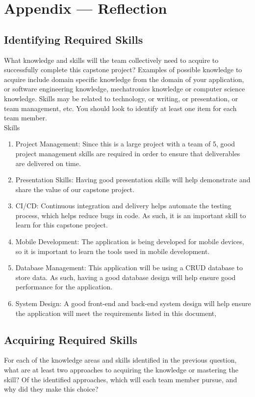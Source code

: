 \documentclass[12pt]{article}
\begin{document}
\newpage{}
\section*{Appendix --- Reflection}


\subsection*{Identifying Required Skills}
 What knowledge and skills will the team collectively need to acquire to successfully complete this capstone project?  Examples of possible knowledge to acquire include domain specific knowledge from the domain of your application, or software engineering knowledge, mechatronics knowledge or computer science knowledge.  Skills may be related to technology, or writing, or presentation, or team management, etc.  You should look to identify at least one item for each team member. \\

Skills
\begin{enumerate}
  \item Project Management: Since this is a large project with a team of 5, good project management skills are required in order to ensure that deliverables are delivered on time.
  \item Presentation Skills: Having good presentation skills will help demonstrate and share the value of our capstone project.
  \item CI/CD: Continuous integration and delivery helps automate the testing process, which helps reduce bugs in code. As such, it is an important skill to learn for this capstone project.  
  \item Mobile Development: The application is being developed for mobile devices, so it is important to learn the tools used in mobile development. 
  \item Database Management: This application will be using a CRUD database to store data. As such, having a good database design will help ensure good performance for the application.
  \item System Design: A good front-end and back-end system design will help ensure the application will meet the requirements listed in this document,
\end{enumerate}

\subsection*{Acquiring Required Skills}
For each of the knowledge areas and skills identified in the previous question, what are at least two approaches to acquiring the knowledge or  mastering the skill?  Of the identified approaches, which will each team  member pursue, and why did they make this choice?
\end{document}
